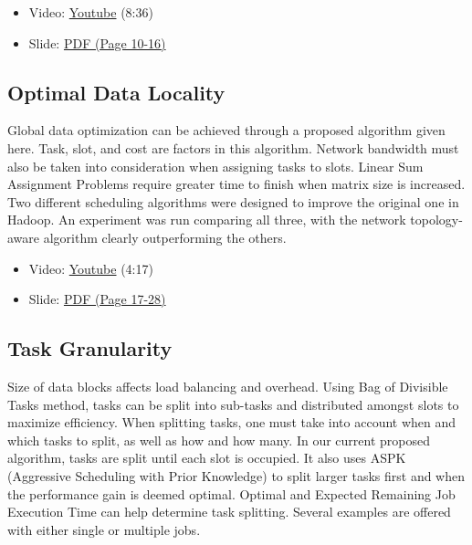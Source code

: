 \begin{itemize}

\item
  Video: \href{https://www.youtube.com/watch?v=RqLA7_asK50}{Youtube}
  (8:36)
\item
  Slide:
  \href{https://drive.google.com/open?id=0B88HKpainTSfT28zLTdKYWhGdGM}{PDF
  (Page 10-16)}
\end{itemize}

\subsection{Optimal Data Locality}\label{optimal-data-locality}

Global data optimization can be achieved through a proposed algorithm
given here. Task, slot, and cost are factors in this algorithm. Network
bandwidth must also be taken into consideration when assigning tasks to
slots. Linear Sum Assignment Problems require greater time to finish
when matrix size is increased. Two different scheduling algorithms were
designed to improve the original one in Hadoop. An experiment was run
comparing all three, with the network topology-aware algorithm clearly
outperforming the others.

\begin{itemize}

\item
  Video: \href{https://www.youtube.com/watch?v=Ok8vdrFXo5w}{Youtube}
  (4:17)
\item
  Slide:
  \href{https://drive.google.com/open?id=0B88HKpainTSfT28zLTdKYWhGdGM}{PDF
  (Page 17-28)}
\end{itemize}

\subsection{Task Granularity}\label{task-granularity}

Size of data blocks affects load balancing and overhead. Using Bag of
Divisible Tasks method, tasks can be split into sub-tasks and
distributed amongst slots to maximize efficiency. When splitting tasks,
one must take into account when and which tasks to split, as well as how
and how many. In our current proposed algorithm, tasks are split until
each slot is occupied. It also uses ASPK (Aggressive Scheduling with
Prior Knowledge) to split larger tasks first and when the performance
gain is deemed optimal. Optimal and Expected Remaining Job Execution
Time can help determine task splitting. Several examples are offered
with either single or multiple jobs.

